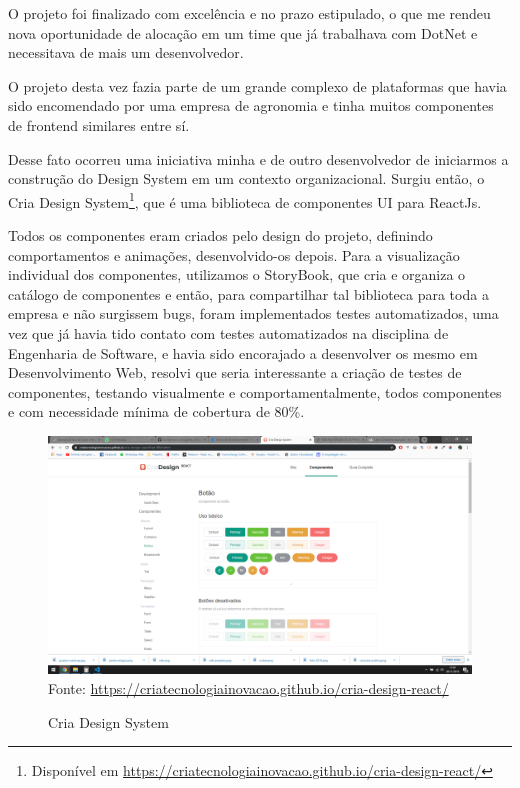 O projeto foi finalizado com excelência e no prazo estipulado, o que me rendeu nova oportunidade de alocação em um time que já trabalhava com DotNet e necessitava de mais um desenvolvedor.

O projeto desta vez fazia parte de um grande complexo de plataformas que havia sido encomendado por uma empresa de agronomia e tinha muitos componentes de frontend similares entre sí.

Desse fato ocorreu uma iniciativa minha e de outro desenvolvedor de iniciarmos a construção do Design System em um contexto organizacional.
Surgiu então, o Cria Design System\footnote{Disponível em \url{https://criatecnologiainovacao.github.io/cria-design-react/}}, que é uma biblioteca de componentes UI para ReactJs.

Todos os componentes eram criados pelo design do projeto, definindo comportamentos e animações, desenvolvido-os depois. Para a visualização individual dos componentes, utilizamos o StoryBook,
que cria e organiza o catálogo de componentes e então, para compartilhar tal biblioteca para toda a empresa e não surgissem bugs, foram implementados testes automatizados, 
uma vez que já havia tido contato com testes automatizados na disciplina de Engenharia de Software, e havia sido encorajado a desenvolver os mesmo em Desenvolvimento Web, resolvi que seria interessante a criação de testes de componentes, testando visualmente e comportamentalmente,
todos componentes e com necessidade mínima de cobertura de 80\%.

\begin{figure}[H]
\centering
\caption{Cria Design System} %
\includegraphics[scale=0.3]{cria-design}\\  %
{\small Fonte: \url{https://criatecnologiainovacao.github.io/cria-design-react/}} %
\label{fig:exemplo} %
\end{figure}

